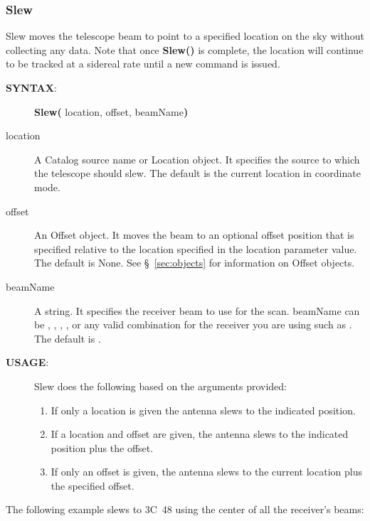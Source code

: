 \subsubsection{Slew}

Slew moves the telescope beam to point to a specified location on the sky without
collecting any data.  Note that once {\bfseries{\textcolor{pythonKeywords}{Slew}}()}
is complete, the location will continue to be tracked at a sidereal rate until a new
command is issued.

\begin{description}
\item[{\bf SYNTAX}:] {\bfseries{\textcolor{pythonKeywords}{Slew}}(}
location, offset, beamName{\bf)}
\item[location] A Catalog source name or Location object. It specifies the 
source to which the telescope should slew. The default is the current
location in  coordinate mode.
\item[offset] An Offset object. It moves the beam to an optional offset 
position that is specified relative to the location specified in the 
location parameter value. The default is None.  See \S~\ref{sec:objects} for
information on Offset objects.
\item[beamName] A string. It specifies the receiver beam to use for the scan. 
beamName can be , , , ,  or any valid combination
for the receiver you are using such as . The default is .
\end{description}

\begin{description}
\item[{\bf USAGE}:] Slew does the following based on the arguments provided:
\begin{enumerate}[label=\bfseries{\arabic*.},leftmargin=*,
labelindent=\parindent, itemsep=1pt]
\item If only a location is given the antenna slews to the indicated position.
\item If a location and offset are given, the antenna slews to the indicated
position plus the offset.
\item If only an offset is given, the antenna slews to the current location
plus the specified offset.
\end{enumerate}
\end{description}

\noindent The following example slews to 3C~48 using the center of all the
receiver's beams:


